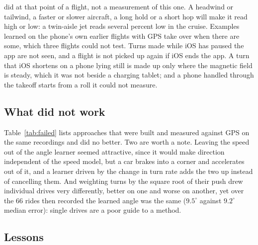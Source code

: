 \documentclass[11pt]{article}
\newcommand{\dg}{^\circ}
\begin{document}
\begin{itemize}
did at that point of a flight, not a measurement of this one. A headwind or tailwind, a faster or slower
aircraft, a long hold or a short hop will make it read high or low: a twin-aisle jet reads several percent
low in the cruise. Examples learned on the phone's own earlier flights with GPS take over when there are
some, which three flights could not test. Turns made while iOS has paused the app are not seen, and a flight
is not picked up again if iOS ends the app. A turn that iOS shortens on a phone lying still is made up only
where the magnetic field is steady, which it was not beside a charging tablet; and a phone handled through
the takeoff starts from a roll it could not measure.
\end{itemize}

\subsection{What did not work}

Table~\ref{tab:failed} lists approaches that were built and measured against GPS on the same
recordings and did no better. Two are worth a note. Leaving the speed out of the angle learner seemed
attractive, since it would make direction independent of the speed model, but a car brakes into a
corner and accelerates out of it, and a learner driven by the change in turn rate adds the two up
instead of cancelling them. And weighting turns by the square root of their push drew individual drives
very differently, better on one and worse on another, yet over the $66$ rides then recorded the learned
angle was the same ($9.5\dg$ against $9.2\dg$ median error): single drives are a poor guide to a method.

\begin{table}[!tp]
\centering\small
\caption{Approaches that were measured and did not do better, each on the recordings available when
it was tried.}
\label{tab:failed}

\end{table}

\subsection{Lessons}
\end{document}
